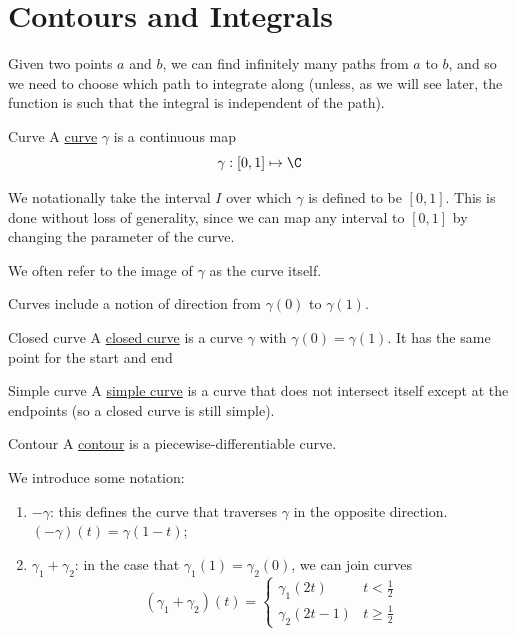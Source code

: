 \documentclass[../Main.tex]{subfiles}
\begin{document}
\section{Contours and Integrals}
Given two points $a$ and $b$, we can find infinitely many paths from $a$ to $b$, and so we need to choose which path to integrate along (unless, as we will see later, the function is such that the integral is independent of the path).
\begin{definition}{Curve}
    A \underline{curve} $\gamma$ is a continuous map
    \begin{equation*}
        \gamma : [0, 1] \mapsto \C
    \end{equation*}
\end{definition}
\begin{remarks}
    \item We notationally take the interval $I$ over which $\gamma$ is defined to be $[0, 1]$. This is done without loss of generality, since we can map any interval to $[0, 1]$ by changing the parameter of the curve.
    \item We often refer to the image of $\gamma$ as the curve itself.
    \item Curves include a notion of direction from $\gamma(0)$ to $\gamma(1)$.
\end{remarks}
\begin{definition}{Closed curve}
    A \underline{closed curve} is a curve $\gamma$ with $\gamma(0) = \gamma(1)$. It has the same point for the start and end
\end{definition}
\begin{definition}{Simple curve}
    A \underline{simple curve} is a curve that does not intersect itself except at the endpoints (so a closed curve is still simple).
\end{definition}
\begin{definition}{Contour}
    A \underline{contour} is a piecewise-differentiable curve.
\end{definition}
We introduce some notation:
\begin{enumerate}
    \item $-\gamma$: this defines the curve that traverses $\gamma$ in the opposite direction. $(-\gamma)(t) = \gamma(1-t)$;
    \item $\gamma_1 + \gamma_2$: in the case that $\gamma_1(1) = \gamma_2(0)$, we can join curves
        \begin{equation*}
            (\gamma_1 + \gamma_2)(t) =
            \begin{cases}
                \gamma_1(2t) & t < \frac12 \\
                \gamma_2(2t-1) & t \geq \frac12
            \end{cases}
        \end{equation*}
\end{enumerate}
\end{document}
